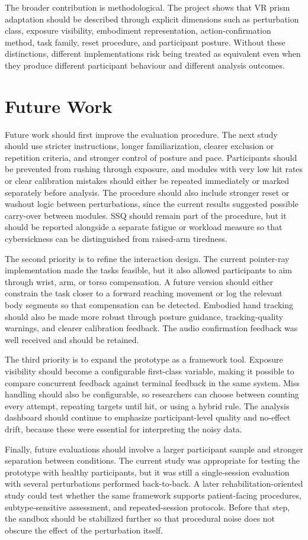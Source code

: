 The broader contribution is methodological. The project shows that VR prism adaptation should be described through explicit dimensions such as perturbation class, exposure visibility, embodiment representation, action-confirmation method, task family, reset procedure, and participant posture. Without these distinctions, different implementations risk being treated as equivalent even when they produce different participant behaviour and different analysis outcomes.

\section{Future Work}
\label{sec:future-work}

Future work should first improve the evaluation procedure. The next study should use stricter instructions, longer familiarization, clearer exclusion or repetition criteria, and stronger control of posture and pace. Participants should be prevented from rushing through exposure, and modules with very low hit rates or clear calibration mistakes should either be repeated immediately or marked separately before analysis. The procedure should also include stronger reset or washout logic between perturbations, since the current results suggested possible carry-over between modules. SSQ should remain part of the procedure, but it should be reported alongside a separate fatigue or workload measure so that cybersickness can be distinguished from raised-arm tiredness.

The second priority is to refine the interaction design. The current pointer-ray implementation made the tasks feasible, but it also allowed participants to aim through wrist, arm, or torso compensation. A future version should either constrain the task closer to a forward reaching movement or log the relevant body segments so that compensation can be detected. Embodied hand tracking should also be made more robust through posture guidance, tracking-quality warnings, and clearer calibration feedback. The audio confirmation feedback was well received and should be retained.

The third priority is to expand the prototype as a framework tool. Exposure visibility should become a configurable first-class variable, making it possible to compare concurrent feedback against terminal feedback in the same system. Miss handling should also be configurable, so researchers can choose between counting every attempt, repeating targets until hit, or using a hybrid rule. The analysis dashboard should continue to emphasize participant-level quality and no-effect drift, because these were essential for interpreting the noisy data.

Finally, future evaluations should involve a larger participant sample and stronger separation between conditions. The current study was appropriate for testing the prototype with healthy participants, but it was still a single-session evaluation with several perturbations performed back-to-back. A later rehabilitation-oriented study could test whether the same framework supports patient-facing procedures, subtype-sensitive assessment, and repeated-session protocols. Before that step, the sandbox should be stabilized further so that procedural noise does not obscure the effect of the perturbation itself.

